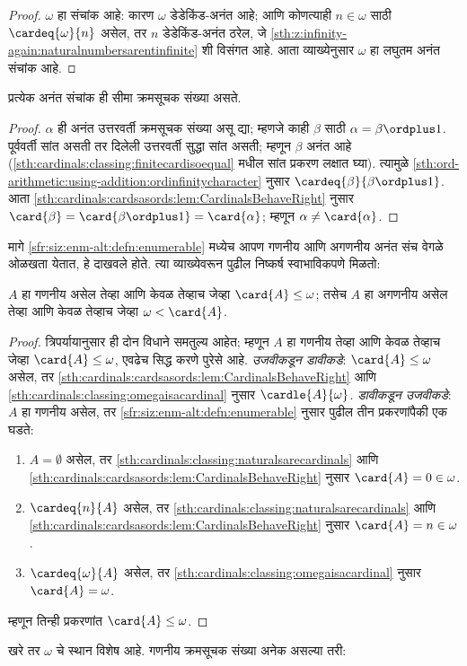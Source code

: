 \begin{proof}
$\omega$ हा संचांक आहे: कारण $\omega$ डेडेकिंड-अनंत आहे; आणि कोणत्याही $n \in \omega$ साठी $\cardeq{\omega}{n}$ असेल, तर $n$ डेडेकिंड-अनंत ठरेल, जे \ref{sth:z:infinity-again:naturalnumbersarentinfinite} शी विसंगत आहे. आता व्याख्येनुसार $\omega$ हा लघुतम अनंत संचांक आहे.
\end{proof}

\begin{cor}
प्रत्येक अनंत संचांक ही सीमा क्रमसूचक संख्या असते.
\end{cor}

\begin{proof}
$\alpha$ ही अनंत उत्तरवर्ती क्रमसूचक संख्या असू द्या; म्हणजे काही $\beta$ साठी $\alpha = \beta
\ordplus 1$. पूर्ववर्ती सांत असती तर दिलेली उत्तरवर्ती सुद्धा सांत असती; म्हणून $\beta$ अनंत आहे (\ref{sth:cardinals:classing:finitecardisoequal} मधील सांत प्रकरण लक्षात घ्या). त्यामुळे \ref{sth:ord-arithmetic:using-addition:ordinfinitycharacter} नुसार $\cardeq{\beta}{\beta \ordplus 1}$. आता
\ref{sth:cardinals:cardsasords:lem:CardinalsBehaveRight} नुसार
$\card{\beta} = \card{\beta\ordplus 1} = \card{\alpha}$; म्हणून
$\alpha \neq \card{\alpha}$.
\end{proof}

मागे \ref{sfr:siz:enm-alt:defn:enumerable} मध्येच आपण गणनीय आणि अगणनीय अनंत संच वेगळे ओळखता येतात, हे दाखवले होते. त्या व्याख्येवरून पुढील निष्कर्ष स्वाभाविकपणे मिळतो:

\begin{prop}
$A$ हा गणनीय असेल तेव्हा आणि केवळ तेव्हाच जेव्हा $\card{A} \leq \omega$; तसेच $A$ हा अगणनीय असेल तेव्हा आणि केवळ तेव्हाच जेव्हा $\omega < \card{A}$.
\end{prop}

\begin{proof}
त्रिपर्यायानुसार ही दोन विधाने समतुल्य आहेत; म्हणून $A$ हा गणनीय तेव्हा आणि केवळ तेव्हाच जेव्हा $\card{A} \leq \omega$, एवढेच सिद्ध करणे पुरेसे आहे. \emph{उजवीकडून डावीकडे}: $\card{A} \leq \omega$ असेल, तर
\ref{sth:cardinals:cardsasords:lem:CardinalsBehaveRight} आणि
\ref{sth:cardinals:classing:omegaisacardinal} नुसार $\cardle{A}{\omega}$. \emph{डावीकडून उजवीकडे}: $A$ हा गणनीय असेल, तर \ref{sfr:siz:enm-alt:defn:enumerable} नुसार पुढील तीन प्रकरणांपैकी एक घडते:
\begin{enumerate}
  \item $A = \emptyset$ असेल, तर \ref{sth:cardinals:classing:naturalsarecardinals} आणि
  \ref{sth:cardinals:cardsasords:lem:CardinalsBehaveRight} नुसार $\card{A} = 0 \in \omega$.
  \item $\cardeq{n}{A}$ असेल, तर \ref{sth:cardinals:classing:naturalsarecardinals} आणि
  \ref{sth:cardinals:cardsasords:lem:CardinalsBehaveRight} नुसार $\card{A} = n \in \omega$.
  \item $\cardeq{\omega}{A}$ असेल, तर \ref{sth:cardinals:classing:omegaisacardinal} नुसार $\card{A} = \omega$.
\end{enumerate}
म्हणून तिन्ही प्रकरणांत $\card{A} \leq \omega$.
\end{proof}
\noindent
खरे तर $\omega$ चे स्थान विशेष आहे. गणनीय क्रमसूचक संख्या अनेक असल्या तरी:

